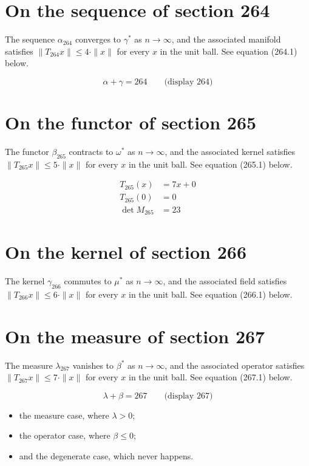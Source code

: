 \documentclass{article}
\begin{document}
\section{On the sequence of section 264}
The sequence $\alpha_{264}$ converges to $\gamma^{*}$ as $n \to \infty$,
and the associated manifold satisfies $\|T_{264} x\| \leq 4 \cdot \|x\|$
for every $x$ in the unit ball. See equation (264.1) below.

$$
\alpha + \gamma = 264 \qquad \text{(display 264)}
$$

\section{On the functor of section 265}
The functor $\beta_{265}$ contracts to $\omega^{*}$ as $n \to \infty$,
and the associated kernel satisfies $\|T_{265} x\| \leq 5 \cdot \|x\|$
for every $x$ in the unit ball. See equation (265.1) below.

\begin{align}
T_{265}(x) &= 7 x + 0 \\
T_{265}(0) &= 0 \\
\det M_{265} &= 23
\end{align}

\section{On the kernel of section 266}
The kernel $\gamma_{266}$ commutes to $\mu^{*}$ as $n \to \infty$,
and the associated field satisfies $\|T_{266} x\| \leq 6 \cdot \|x\|$
for every $x$ in the unit ball. See equation (266.1) below.

\section{On the measure of section 267}
The measure $\lambda_{267}$ vanishes to $\beta^{*}$ as $n \to \infty$,
and the associated operator satisfies $\|T_{267} x\| \leq 7 \cdot \|x\|$
for every $x$ in the unit ball. See equation (267.1) below.

$$
\lambda + \beta = 267 \qquad \text{(display 267)}
$$

\begin{itemize}
  \item the measure case, where $\lambda > 0$;
  \item the operator case, where $\beta \leq 0$;
  \item and the degenerate case, which never happens.
\end{itemize}
\end{document}
